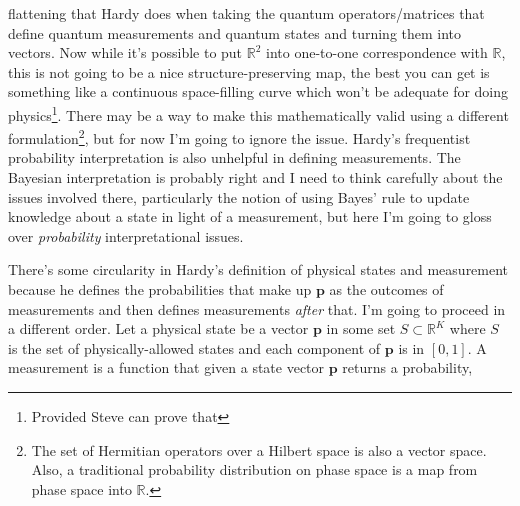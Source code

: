 \documentclass[12pt]{article}
\newcommand{\R}{{\mathbb R}} %
\begin{document}
flattening that Hardy does when taking the quantum operators/matrices
that define quantum measurements and quantum states and turning them
into vectors.  Now while it's possible to put $\R^2$ into one-to-one
correspondence with $\R$, this is not going to be a nice
structure-preserving map, the best you can get is something like a
continuous space-filling curve which won't be adequate for doing
physics\footnote{Provided Steve can prove that}.  There may be a way
to make this mathematically valid using a different
formulation\footnote{The set of Hermitian operators over a Hilbert
  space is also a vector space.  Also, a traditional probability
  distribution on phase space is a map from phase space into $\R$.},
but for now I'm going to ignore the issue.  Hardy's frequentist
probability interpretation is also unhelpful in defining measurements.
The Bayesian interpretation is probably right and I need to think
carefully about the issues involved there, particularly the notion of
using Bayes' rule to update knowledge about a state in light of a
measurement, but here I'm going to gloss over \emph{probability}
interpretational issues.


There's some circularity in Hardy's definition of physical states and
measurement because he defines the probabilities that make up
$\mathbf{p}$ as the outcomes of measurements and then defines
measurements \emph{after} that.  I'm going to proceed in a different
order.  Let a physical state be a vector $\mathbf{p}$ in some set $S
\subset \R^K$ where $S$ is the set of physically-allowed states and
each component of $\mathbf{p}$ is in $[0,1]$.  A measurement is a
function that given a state vector $\mathbf{p}$ returns a probability,
\end{document}
